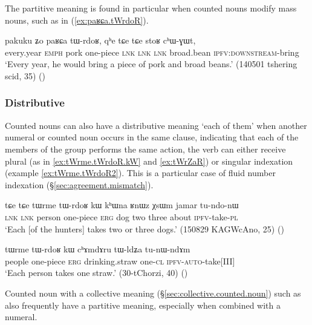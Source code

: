 The partitive meaning is found in particular when counted nouns modify mass nouns, such as  in (\ref{ex:paʁɕa.tWrdoR}).  

\begin{exe}
	\ex \label{ex:paʁɕa.tWrdoR}
	\gll pakuku ʑo paʁɕa tɯ-rdoʁ, qʰe tɕe tɕe stoʁ cʰɯ-ɣɯt, \\
	every.year \textsc{emph} pork one-piece \textsc{lnk} \textsc{lnk} \textsc{lnk} broad.bean \textsc{ipfv}:\textsc{downstream}-bring \\
	\glt `Every year, he would bring a piece of pork and broad beans.' (140501 tshering scid, 35)
()
\end{exe} 

\subsubsection{Distributive} \label{sec:CN.distributive}
Counted nouns can also have a distributive meaning  `each of them' when another numeral or counted noun occurs in the same clause, indicating that each of the members of the group performs the same action, the verb can either receive plural (as in \ref{ex:tWrme.tWrdoR.kW} and \ref{ex:tWrZaR}) or singular indexation (example \ref{ex:tWrme.tWrdoR2}). This is a particular case of fluid number indexation (§\ref{sec:agreement.mismatch}).

\begin{exe}
	\ex \label{ex:tWrme.tWrdoR.kW}
	\gll  tɕe tɕe tɯrme tɯ-rdoʁ kɯ kʰɯna ʁnɯz χsɯm jamar tu-ndo-nɯ \\
	\textsc{lnk} \textsc{lnk}  person one-piece \textsc{erg} dog two three about \textsc{ipfv}-take-\textsc{pl} \\
	\glt `Each [of the hunters] takes two or three dogs.' (150829 KAGWcAno, 25)
()
\end{exe} 

\begin{exe}
	\ex \label{ex:tWrme.tWrdoR2}
	\gll tɯrme tɯ-rdoʁ kɯ cʰɤmdɤru tɯ-ldʑa tu-nɯ-ndɤm  \\
	people one-piece \textsc{erg} drinking.straw one-\textsc{cl} \textsc{ipfv}-\textsc{auto}-take[III] \\
	\glt `Each person takes one straw.' (30-tChorzi, 40)
()
\end{exe}
 

Counted noun with a collective meaning (§\ref{sec:collective.counted.noun}) such as  also frequently have a partitive meaning, especially when combined with a numeral.

